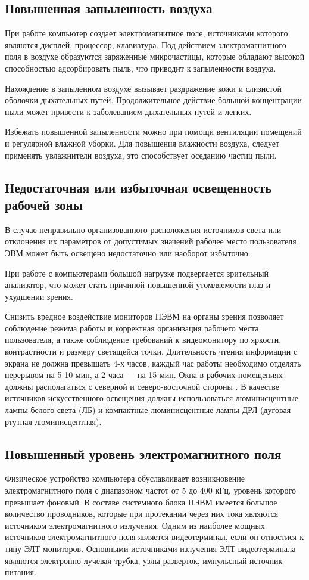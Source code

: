 \documentclass[14pt,oneside,final]{extreport}
\begin{document}
	\subsection{Повышенная запыленность воздуха}
	При работе компьютер создает электромагнитное поле, источниками которого являются дисплей, процессор, клавиатура. Под действием электромагнитного поля в воздухе образуются заряженные микрочастицы, которые обладают высокой способностью адсорбировать пыль, что приводит к запыленности воздуха. 
	
	Нахождение в запыленном воздухе вызывает раздражение кожи и слизистой оболочки дыхательных путей. Продолжительное действие большой концентрации пыли может привести к заболеванием дыхательных путей и легких. 
	
	Избежать повышенной запыленности можно при помощи вентиляции помещений и регулярной влажной уборки. Для повышения влажности воздуха, следует применять увлажнители воздуха, это способствует оседанию частиц пыли. 
	\subsection{Недостаточная или избыточная освещенность рабочей зоны}
	В случае неправильно организованного расположения источников света или отклонения их параметров от допустимых значений рабочее место пользователя ЭВМ может быть освещено недостаточно или наоборот избыточно.
	
	При работе с компьютерами большой нагрузке подвергается зрительный анализатор, что может стать причиной повышенной утомляемости глаз и ухудшении зрения.
	
	Снизить вредное воздействие мониторов ПЭВМ на органы зрения позволяет соблюдение режима работы и корректная организация рабочего места пользователя, а также соблюдение требований к видеомонитору по яркости, контрастности и размеру светящейся точки. Длительность чтения информации с экрана не должна превышать 4-х часов, каждый час работы необходимо отделять перерывом на 5-10 мин, а 2 часа --- на 15 мин. Окна в рабочих помещениях должны располагаться с северной и северо-восточной стороны \cite{book:BZD}. В качестве источников искусственного освещения должны использоваться люминисцентные лампы белого света (ЛБ) и компактные люминисцентные лампы ДРЛ (дуговая ртутная люминисцентная). 
	\subsection{Повышенный уровень электромагнитного поля}
	Физическое устройство компьютера обуславливает возникновение электромагнитного поля с диапазоном частот от 5 до 400 кГц, уровень которого превышает фоновый. В составе системного блока ПЭВМ имеется большое количество проводников, которые при протекании через них тока являются источником электромагнитного излучения. Одним из наиболее мощных источников электромагнитного поля является видеотерминал, если он отностися к типу ЭЛТ мониторов. Основными источниками излучения ЭЛТ видеотерминала являются электронно-лучевая трубка, узлы разверток, импульсный источник питания. 
	
\end{document}
